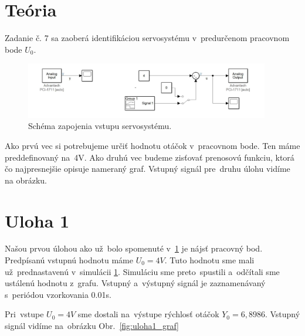 \documentclass{article}
\begin{document}
\clearpage

\section{Teória}
\label{sec:teoria}

Zadanie č. 7 sa zaoberá identifikáciou servosystému v~predurčenom pracovnom bode $U_0$.

\begin{figure}[!htbp]
	\begin{center}
		\includegraphics[width=0.95\textwidth]{include/schema.png}
	\end{center}
	\caption{Schéma zapojenia vstupu servosystému.}
	\label{fig:schema}
\end{figure}

Ako prvú vec si potrebujeme určiť hodnotu otáčok v~pracovnom bode. Ten máme preddefinovaný na~4V. Ako druhú vec budeme
zisťovať prenosovú funkciu, ktorá čo najpresnejšie opisuje nameraný graf. Vstupný signál pre~druhu úlohu vidíme na
obrázku.

\clearpage

\section{Uloha 1}
\label{sec:u1}

Našou prvou úlohou ako už~bolo spomenuté v~\ref{sec:teoria} je nájsť pracovný bod. Predpísanú vstupnú hodnotu máme
$U_0 = 4V$. Tuto hodnotu sme mali už~prednastavenú v~simulácii \ref{fig:schema}. Simuláciu sme preto~spustili
a~odčítali sme ustálenú hodnotu z~grafu. Vstupný a~výstupný signál je zaznamenávaný s~periódou vzorkovania 0.01s.

Pri~vstupe $U_0 = 4V$ sme dostali na~výstupe rýchlosť otáčok $Y_0 = 6,8986$. Vstupný signál vidíme na~obrázku
Obr.~\ref{fig:uloha1_graf}
\end{document}
